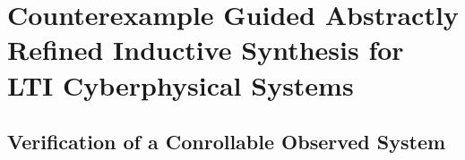 \documentclass[runningheads,a4paper]{llncs}
\begin{document}


\section{Counterexample Guided Abstractly Refined Inductive Synthesis for LTI Cyberphysical Systems}\label{sec:CEGARIS}

\subsection{Verification of a Conrollable Observed System}\label{sec:cof_verification}
\end{document}
